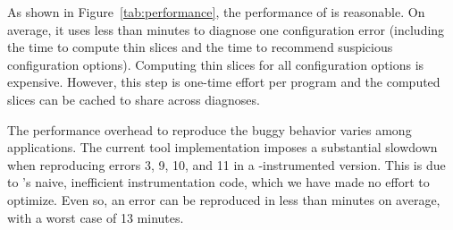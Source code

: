 As shown in Figure~\ref{tab:performance},
the performance of \ourtool is reasonable.
On average, it uses less than \avgtime minutes to
diagnose one configuration error (including
the time to compute thin slices and the time
to recommend suspicious configuration options). Computing
thin slices for all configuration options
is expensive. However, this step is one-time effort
per program and the computed slices can be cached
to share across diagnoses. %


The performance overhead to reproduce the buggy behavior varies
among applications. The current tool implementation
imposes a substantial slowdown when reproducing
errors 3, 9, 10, and 11 in a \ourtool-instrumented version.
This is due to \ourtool's naive,
inefficient instrumentation code, which we have made no effort to optimize.
Even so, an error can be reproduced in less than \avgtime 
minutes on average, with a worst case of 13 minutes.






